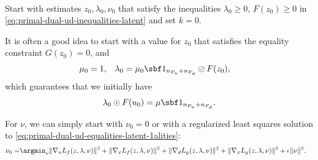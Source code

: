 \documentclass[11pt]{article}
\begin{document}
\begin{algorithm}~\label{al:primal-dual-latent}
\begin{steps}
\item Start with estimates $z_0,\lambda_0,\nu_0$ that satisfy the inequalities
  $\lambda_0\ge 0$, $F(z_0)\ge 0$ in \eqref{eq:primal-dual-ud-inequalities-latent} and set $k=0$.

  It is often a good idea to start with a value for $z_0$ that
  satisfies the equality constraint $G(z_0)=0$, and
  \begin{align*}
    \mu_0&=1, &
    \lambda_0&=\mu_0\sbf 1_{n_{F_u}+n_{F_d}}\oslash F(z_0),
  \end{align*}
  which guarantees that we initially have 
  \begin{align*}
    \lambda_0\odot F(u_0)=\mu\sbf 1_{n_{F_u}+n_{F_d}}.
  \end{align*}

  For $\nu$, we can simply start with $\nu_0=0$ or with a regularized least
  squares solution to
  \eqref{eq:primal-dual-ud-equalities-latent-1alities}:
  \begin{align*}
    \nu_0=&\argmin_\nu \|\nabla_u L_f(z,\lambda,\nu)\|^2+\|\nabla_x L_f(z,\lambda,\nu)\|^2
    +\|\nabla_d L_g(z,\lambda,\nu)\|^2+\|\nabla_x L_g(z,\lambda,\nu)\|^2+\epsilon\|\nu\|^2.
  \end{align*}


\end{steps}
\end{algorithm}
\end{document}
